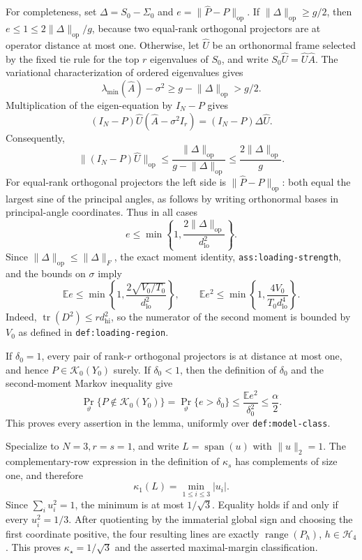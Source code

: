 For completeness, set \(\Delta=S_0-\Sigma_0\) and \(e=\lVert\widehat P-P\rVert_{\mathrm{op}}\).  If \(\lVert\Delta\rVert_{\mathrm{op}}\ge g/2\), then \(e\le1\le2\lVert\Delta\rVert_{\mathrm{op}}/g\), because two equal-rank orthogonal projectors are at operator distance at most one.  Otherwise, let \(\widehat U\) be an orthonormal frame selected by the fixed tie rule for the top \(r\) eigenvalues of \(S_0\), and write \(S_0\widehat U=\widehat U\widehat A\).  The variational characterization of ordered eigenvalues gives
\[
 \lambda_{\min}(\widehat A)-\sigma^2
 \ge g-\lVert\Delta\rVert_{\mathrm{op}}>g/2.
\]
Multiplication of the eigen-equation by \(I_N-P\) gives
\[
 (I_N-P)\widehat U(\widehat A-\sigma^2I_r)
 =(I_N-P)\Delta\widehat U.
\]
Consequently,
\[
 \lVert(I_N-P)\widehat U\rVert_{\mathrm{op}}
 \le\frac{\lVert\Delta\rVert_{\mathrm{op}}}
          {g-\lVert\Delta\rVert_{\mathrm{op}}}
 \le\frac{2\lVert\Delta\rVert_{\mathrm{op}}}{g}.
\]
For equal-rank orthogonal projectors the left side is \(\lVert\widehat P-P\rVert_{\mathrm{op}}\): both equal the largest sine of the principal angles, as follows by writing orthonormal bases in principal-angle coordinates.  Thus in all cases
\[
 e\le\min\left\{1,\frac{2\lVert\Delta\rVert_{\mathrm{op}}}{d_{\mathrm{lo}}^2}\right\}.
\]
Since \(\lVert\Delta\rVert_{\mathrm{op}}\le\lVert\Delta\rVert_F\), the exact moment identity, \texttt{ass:loading-strength}, and the bounds on \(\sigma\) imply
\[
 \mathbb E e\le\min\left\{1,\frac{2\sqrt{V_0/T_0}}{d_{\mathrm{lo}}^2}\right\},
 \qquad
 \mathbb E e^2\le\min\left\{1,\frac{4V_0}{T_0d_{\mathrm{lo}}^4}\right\}.
\]
Indeed, \(\operatorname{tr}(D^2)\le rd_{\mathrm{hi}}^2\), so the numerator of the second moment is bounded by \(V_0\) as defined in \texttt{def:loading-region}.

If \(\delta_0=1\), every pair of rank-\(r\) orthogonal projectors is at distance at most one, and hence \(P\in\mathcal K_0(Y_0)\) surely.  If \(\delta_0<1\), then the definition of \(\delta_0\) and the second-moment Markov inequality give
\[
 \Pr_\vartheta\{P\notin\mathcal K_0(Y_0)\}
 =\Pr_\vartheta\{e>\delta_0\}
 \le\frac{\mathbb Ee^2}{\delta_0^2}
 \le\frac\alpha2.
\]
This proves every assertion in the lemma, uniformly over \texttt{def:model-class}.

Specialize to \(N=3,r=s=1\), and write \(L=\operatorname{span}(u)\) with \(\lVert u\rVert_2=1\).  The complementary-row expression in the definition of \(\kappa_s\) has complements of size one, and therefore
\[
 \kappa_1(L)=\min_{1\le i\le3}|u_i|.
\]
Since \(\sum_i u_i^2=1\), the minimum is at most \(1/\sqrt3\).  Equality holds if and only if every \(u_i^2=1/3\).  After quotienting by the immaterial global sign and choosing the first coordinate positive, the four resulting lines are exactly \(\operatorname{range}(P_h)\), \(h\in\mathcal H_4\).  This proves \(\kappa_\star=1/\sqrt3\) and the asserted maximal-margin classification.

